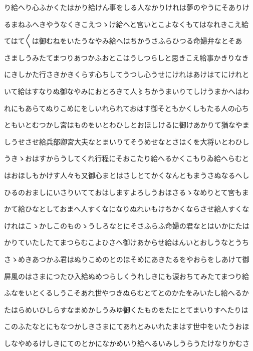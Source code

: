 \documentclass[a4paper,11pt,landscape]{ltjtarticle}
\begin{document}
\par\medskip
り給へり心ふかくたはかり給けん事をしる人なかりけれは夢のやうにそありけ
\par\medskip
るまねふへきやうなくきこえつゝけ給へと宮いとこよなくもてはなれきこえ給
\par\medskip
てはて〱は御むねをいたうなやみ給へはちかうさふらひつる命婦弁なとそあ
\par\medskip
さましうみたてまつりあつかふおとこはうしつらしと思きこえ給事かきりなき
\par\medskip
にきしかた行さきかきくらす心ちしてうつし心うせにけれはあけはてにけれと
\par\medskip
いて給はすなりぬ御なやみにおとろきて人〻ちかうまいりてしけうまかへはわ
\par\medskip
れにもあらてぬりこめにをしいれられておはす御そともかくしもたる人の心ち
\par\medskip
ともいとむつかし宮はものをいとわひしとおほしけるに御けあかりて猶なやま
\par\medskip
しうせさせ給兵部卿宮大夫なとまいりてそうめせなとさはくを大将いとわひし
\par\medskip
うきゝおはすからうしてくれ行程にそおこたり給へるかくこもりゐ給へらむと
\par\medskip
はおほしもかけす人々も又御心まとはさしとてかくなんともまうさぬなるへし
\par\medskip
ひるのおましにいさりいてておはしますよろしうおほさるゝなめりとて宮もま
\par\medskip
かて給ひなとしておまへ人すくなになりぬれいもけちかくならさせ給人すくな
\par\medskip
けれはこゝかしこのものゝうしろなとにそさふらふ命婦の君なとはいかにたは
\par\medskip
かりていたしたてまつらむこよひさへ御けあからせ給はんいとおしうなとうち
\par\medskip
さゝめきあつかふ君はぬりこめのとのほそめにあきたるをやおらをしあけて御
\par\medskip
屏風のはさまにつたひ入給ぬめつらしくうれしきにも涙おちてみたてまつり給
\par\medskip
ふなをいとくるしうこそあれ世やつきぬらむとてとのかたをみいたし給へるか
\par\medskip
たはらめいひしらすなまめかしうみゆ御くたものをたにとてまいりすへたりは
\par\medskip
このふたなとにもなつかしきさまにてあれとみいれたまはす世中をいたうおほ
\par\medskip
しなやめるけしきにてのとかになかめいり給へるいみしうらうたけなりかむさ
\end{document}
